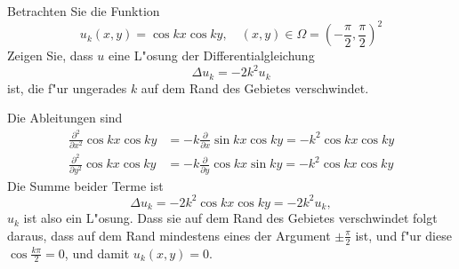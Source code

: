 Betrachten Sie die Funktion
\[
u_k(x,y)
=
\cos kx\cos ky,\quad (x,y)\in\Omega=\left(-\frac{\pi}2,\frac{\pi}2\right)^2
\]
Zeigen Sie, dass $u$ eine L"osung der Differentialgleichung
\[
\Delta u_k=-2k^2 u_k
\]
ist, die f"ur ungerades $k$ auf dem Rand des Gebietes verschwindet.

\begin{loesung}
Die Ableitungen sind
\begin{align*}
\frac{\partial^2}{\partial x^2}\cos kx\cos ky
&=
-k\frac{\partial}{\partial x}\sin kx\cos ky
=
-k^2\cos kx\cos ky
\\
\frac{\partial^2}{\partial y^2}\cos kx\cos ky
&=
-k\frac{\partial}{\partial y}\cos kx\sin ky
=
-k^2\cos kx\cos ky
\end{align*}
Die Summe beider Terme ist
\[
\Delta u_k=-2k^2 \cos kx\cos ky=-2k^2u_k,
\]
$u_k$ ist also ein L"osung. Dass sie auf dem Rand des Gebietes
verschwindet folgt daraus, dass auf dem Rand mindestens eines
der Argument $\pm\frac{\pi}2$ ist, und f"ur diese $\cos \frac{k\pi}2=0$,
und damit $u_k(x,y)=0$.
\end{loesung}
